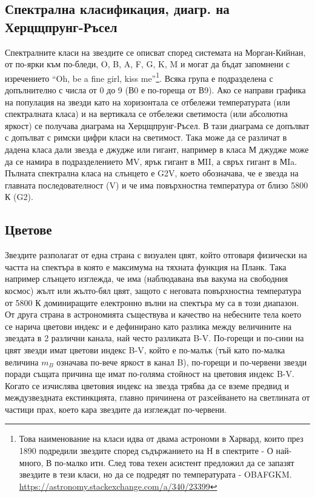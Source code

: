 \documentclass[a4paper,12pt]{article}
\begin{document}
\subsection{Спектрална класификация, диагр. на Херцщпрунг-Ръсел}
Спектралните класи на звездите се описват според системата на Морган-Кийнан, от по-ярки към по-бледи, O, B, A, F, G, K, M и могат да бъдат запомнени с изречението ``Oh, be a fine girl, kiss me''\footnote{Това наименование на класи идва от двама астрономи в Харвард, които през 1890 подредили звездите според съдържанието на Н в спектрите - О най-много, В по-малко итн. След това техен асистент предложил да се запазят звездите в тези класи, но да се подредят по температурата - OBAFGKM. \url{https://astronomy.stackexchange.com/a/340/23399}}. Всяка група е подразделена с допълнително с числа от 0 до 9 (В0 е по-гореща от В9). Ако се направи графика на популация на звезди като на хоризонтала се отбележи температурата (или спектралната класа) и на вертикала се отбележи светимоста (или абсолютна яркост) се получава диаграма на Херцщпрунг-Ръсел. В тази диаграма се допълват с допълват с римски цифри класи на светимост. Така може да се различат в дадена класа дали звезда е джудже или гигант, например в класа М джудже може да се намира в подразделението МV, ярък гигант в МII, а свръх гигант в МIa. Пълната спектрална класа на слънцето е G2V, което обозначава, че е звезда на главната последователност (V) и че има повърхностна температура от близо 5800 К (G2).


\subsection{Цветове}
Звездите разполагат от една страна с визуален цвят, който отговаря физически на частта на спектъра в която е максимума на тяхната функция на Планк. Така например слънцето изглежда, че има (наблюдавана във вакума на свободния космос) жълт или жълто-бял цвят, защото с неговата повърхностна температура от 5800 К доминиращите електронно вълни на спектъра му са в този диапазон. От друга страна в астрономията съществува и качество на небесните тела което се нарича цветови индекс и е дефинирано като разлика между величините на звездата в 2 различни канала, най често разликата B-V. По-горещи и по-сини на цвят звезди имат цветови индекс B-V, който е по-малък (тъй като по-малка величина $m_B$ означава по-вече яркост в канал B), по-горещи и по-червени звезди поради същата причина ще имат по-голяма стойност на цветовия индекс B-V. Когато се изчислява цветовия индекс на звезда трябва да се вземе предвид и междузвездната екстинкцията, главно причинена от разсейването на светлината от частици прах, което кара звездите да изглеждат по-червени.  
\end{document}
